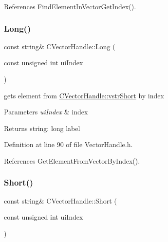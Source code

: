 References Find\+Element\+In\+Vector\+Get\+Index().

\mbox{\label{classCVectorHandle_a392678513c7224a67022720797ac7b1b}} 
\subsubsection{\texorpdfstring{Long()}{Long()}}
{\footnotesize\ttfamily const string\& C\+Vector\+Handle\+::\+Long (\begin{DoxyParamCaption}\item[{const unsigned int}]{ui\+Index }\end{DoxyParamCaption})\hspace{0.3cm}{\ttfamily [inline]}}



gets element from \hyperlink{classCVectorHandle_afb50c8a33d4cf70bf92c644dca409ea2}{C\+Vector\+Handle\+::vstr\+Short} by index 


\begin{DoxyParams}{Parameters}
{\em ui\+Index} & index \\
\hline
\end{DoxyParams}
\begin{DoxyReturn}{Returns}
string\+: long label 
\end{DoxyReturn}


Definition at line 90 of file Vector\+Handle.\+h.



References Get\+Element\+From\+Vector\+By\+Index().

\mbox{\label{classCVectorHandle_ac26fa8d3b66a5cc88dea0b411f5e20de}} 
\subsubsection{\texorpdfstring{Short()}{Short()}}
{\footnotesize\ttfamily const string\& C\+Vector\+Handle\+::\+Short (\begin{DoxyParamCaption}\item[{const unsigned int}]{ui\+Index }\end{DoxyParamCaption})\hspace{0.3cm}{\ttfamily [inline]}}



